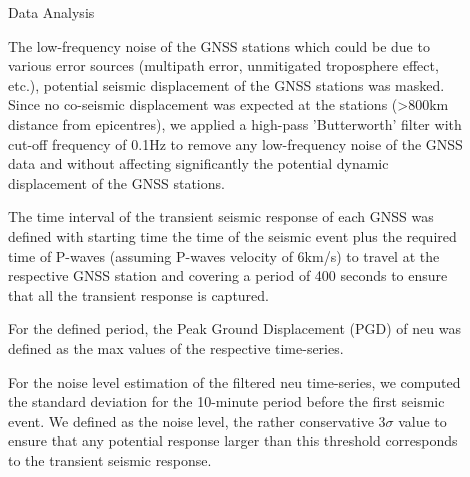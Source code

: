 \documentclass[final,a0,portrait]{beamer}
\newlength{\sepwid}
\newlength{\onecolwid}
\newlength{\twocolwid}
\begin{document}
\begin{frame}[t]
\begin{columns}[t]
\begin{column}{\onecolwid}
%




\end{column} %

\begin{column}{\sepwid}\end{column}

\begin{column}{\twocolwid} 


\begin{block}{Data Analysis}

{\small
The low-frequency noise of the GNSS stations which could be due to various error sources (multipath error, unmitigated troposphere effect, etc.), potential seismic displacement of the GNSS stations was masked. Since no co-seismic displacement was expected at the stations (>800km distance from epicentres), we applied a high-pass 'Butterworth' filter with cut-off frequency of 0.1Hz to remove any low-frequency noise of the GNSS data and without affecting significantly the potential dynamic displacement of the GNSS stations.

The time interval of the transient seismic response of each GNSS was defined with starting time the time of the seismic event plus the required time of P-waves (assuming P-waves velocity of 6km/s) to travel at the respective GNSS station and covering a period of 400 seconds to ensure that all the transient response is captured.

For the defined period, the Peak Ground Displacement (PGD) of neu was defined as the max values of the respective time-series.

For the noise level estimation of the filtered neu time-series, we computed the standard deviation for the 10-minute period before the first seismic event. We defined as the noise level, the rather conservative 3$\sigma$ value to ensure that any potential response larger than this threshold corresponds to the transient seismic response.
}
\vspace*{.2cm}


\end{block}
\end{column}
\end{columns}
\end{frame}
\end{document}
